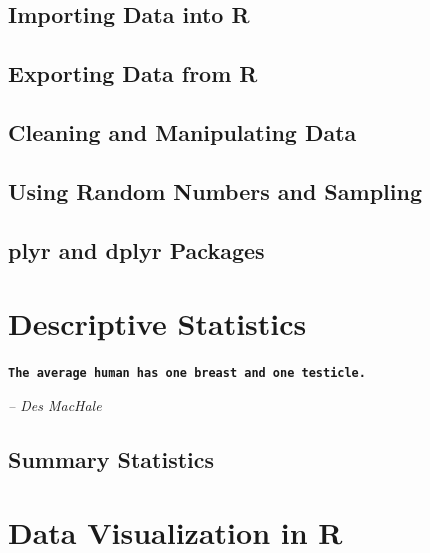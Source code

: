 \documentclass[10pt, letterpaper, twoside]{memoir}\usepackage{knitr}
\newcommand{\chapterendsymbol}{
    \vspace{24pt}
    \Huge
    \hrulefill \hspace{0.1in} \hspace{0.1in} \hrulefill
    \normalsize
    }
\begin{document}
\section{Importing Data into R}


\section{Exporting Data from R}

\section{Cleaning and Manipulating Data}


\section{Using Random Numbers and Sampling}


\section{plyr and dplyr Packages}

\chapterendsymbol





\chapter{Descriptive Statistics}

\begin{flushright}

\textbf{\texttt{The average human has one breast and one testicle.}}

\emph{-- Des MacHale}

\end{flushright}

\vspace{12pt}


\section{Summary Statistics}


\chapterendsymbol





\chapter{Data Visualization in R}
\end{document}
